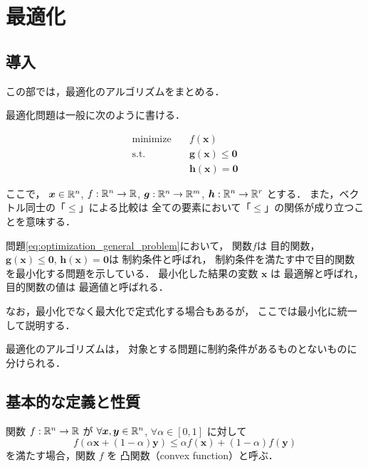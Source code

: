 %

\part{最適化}

\chapter{導入}

この部では，最適化のアルゴリズムをまとめる．

最適化問題は一般に次のように書ける．

\begin{align}\label{eq:optimization_general_problem}
    \text{minimize} \hspace{1em} & f(\bm{x})                 \\
    \text{s.t.} \hspace{1em}     & \bm{g}(\bm{x}) \le \bm{0} \\
                                 & \bm{h}(\bm{x}) = \bm{0}
\end{align}

ここで，
$\bm{x} \in \mathbb{R}^n$,
$f : \mathbb{R}^n \to \mathbb{R}$,
$\bm{g} : \mathbb{R}^n \to \mathbb{R}^m$,
$\bm{h} : \mathbb{R}^n \to \mathbb{R}^r$
とする．
また，ベクトル同士の「$\le$」による比較は
全ての要素において「$\le$」の関係が成り立つことを意味する．

問題\eqref{eq:optimization_general_problem}において，
関数$f$は  目的関数，
$\bm{g}(\bm{x}) \le \bm{0}$, $\bm{h}(\bm{x}) = \bm{0}$は
 制約条件と呼ばれ，
制約条件を満たす中で目的関数を最小化する問題を示している．
最小化した結果の変数 $\bm{x}$ は  最適解と呼ばれ，
目的関数の値は  最適値と呼ばれる．

なお，最小化でなく最大化で定式化する場合もあるが，
ここでは最小化に統一して説明する．

最適化のアルゴリズムは，
対象とする問題に制約条件があるものとないものに分けられる．

\chapter{基本的な定義と性質}

\begin{definition}
    関数 $f : \mathbb{R}^n \to \mathbb{R}$ が
    $\forall \bm{x}, \bm{y} \in \mathbb{R}^n$, $\forall \alpha \in [0, 1]$ に対して
    \begin{equation}
        f\left(\alpha \bm{x} + (1-\alpha) \bm{y}\right)
        \le \alpha f(\bm{x}) + (1-\alpha) f(\bm{y})
    \end{equation}
    を満たす場合，関数 $f$ を  凸関数（convex function）と呼ぶ．
\end{definition}


